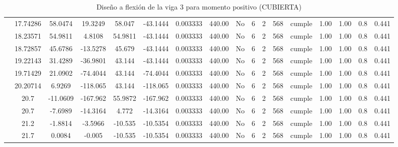 \begin{table}[H]
{\begin{tabular}{|c|c|c|c|c|c|c|c|c|c|c|c|c|c|c|c|c|}
\cline{2-17}    & 17.74286 & 58.0474 & 19.3249 & 58.047 & -43.1444 & 0.003333 & 440.00 & No  & 6   & 2   & 568 & \cellcolor[rgb]{ .776,  .937,  .808}cumple & 1.00 & 1.00 & 0.8 & 0.441 \bigstrut\\
\cline{2-17}    & 18.23571 & 54.9811 & 4.8108 & 54.9811 & -43.1444 & 0.003333 & 440.00 & No  & 6   & 2   & 568 & \cellcolor[rgb]{ .776,  .937,  .808}cumple & 1.00 & 1.00 & 0.8 & 0.441 \bigstrut\\
\cline{2-17}    & 18.72857 & 45.6786 & -13.5278 & 45.679 & -43.1444 & 0.003333 & 440.00 & No  & 6   & 2   & 568 & \cellcolor[rgb]{ .776,  .937,  .808}cumple & 1.00 & 1.00 & 0.8 & 0.441 \bigstrut\\
\cline{2-17}    & 19.22143 & 31.4289 & -36.9801 & 43.144 & -43.1444 & 0.003333 & 440.00 & No  & 6   & 2   & 568 & \cellcolor[rgb]{ .776,  .937,  .808}cumple & 1.00 & 1.00 & 0.8 & 0.441 \bigstrut\\
\cline{2-17}    & 19.71429 & 21.0902 & -74.4044 & 43.144 & -74.4044 & 0.003333 & 440.00 & No  & 6   & 2   & 568 & \cellcolor[rgb]{ .776,  .937,  .808}cumple & 1.00 & 1.00 & 0.8 & 0.441 \bigstrut\\
\cline{2-17}    & 20.20714 & 6.9269 & -118.065 & 43.144 & -118.065 & 0.003333 & 440.00 & No  & 6   & 2   & 568 & \cellcolor[rgb]{ .776,  .937,  .808}cumple & 1.00 & 1.00 & 0.8 & 0.441 \bigstrut\\
\cline{2-17}    & 20.7 & -11.0609 & -167.962 & 55.9872 & -167.962 & 0.003333 & 440.00 & No  & 6   & 2   & 568 & \cellcolor[rgb]{ .776,  .937,  .808}cumple & 1.00 & 1.00 & 0.8 & 0.441 \bigstrut\\
\cline{2-17}    & 20.7 & -7.6989 & -14.3164 & 4.772 & -14.3164 & 0.003333 & 440.00 & No  & 6   & 2   & 568 & \cellcolor[rgb]{ .776,  .937,  .808}cumple & 1.00 & 1.00 & 0.8 & 0.441 \bigstrut\\
\cline{2-17}    & 21.2 & -1.8814 & -3.5966 & -10.535 & -10.5354 & 0.003333 & 440.00 & No  & 6   & 2   & 568 & \cellcolor[rgb]{ .776,  .937,  .808}cumple & 1.00 & 1.00 & 0.8 & 0.441 \bigstrut\\
\cline{2-17}    & 21.7 & 0.0084 & -0.005 & -10.535 & -10.5354 & 0.003333 & 440.00 & No  & 6   & 2   & 568 & \cellcolor[rgb]{ .776,  .937,  .808}cumple & 1.00 & 1.00 & 0.8 & 0.441 \bigstrut\\
\hline
\end{tabular}%

  
  


  }%
    \caption{Diseño a flexión de la viga 3 para momento positivo (CUBIERTA) }
  \label{tab:F VG3 CUB M+}%
\end{table}%
